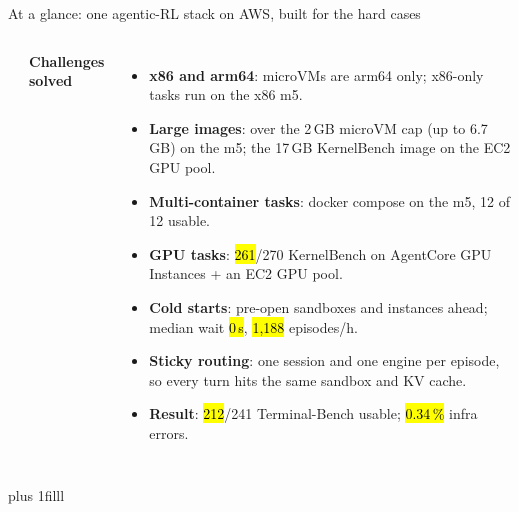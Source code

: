 \begin{frame}{At a glance: one agentic-RL stack on AWS, built for the hard cases}
\begin{columns}[T]
\begin{itemize}
\end{itemize}
{\normalsize\textbf{\textcolor{awsteal}{Challenges solved}}}
\begin{itemize}\footnotesize\setlength{\itemsep}{0.3mm}
\item \textbf{x86 and arm64}: microVMs are arm64 only; x86-only tasks run on the x86 m5.
\item \textbf{Large images}: over the 2\,GB microVM cap (up to 6.7\,GB) on the m5; the 17\,GB KernelBench image on the EC2 GPU pool.
\item \textbf{Multi-container tasks}: docker compose on the m5, 12 of 12 usable.
\item \textbf{GPU tasks}: \hl{261}/270 KernelBench on AgentCore GPU Instances + an EC2 GPU pool.
\item \textbf{Cold starts}: pre-open sandboxes and instances ahead; median wait \hl{0\,s}, \hl{1{,}188} episodes/h.
\item \textbf{Sticky routing}: one session and one engine per episode, so every turn hits the same sandbox and KV cache.
\item \textbf{Result}: \hl{212}/241 Terminal-Bench usable; \hl{0.34\,\%} infra errors.
\end{itemize}
\end{columns}
\par\vskip 0pt plus 1filll
\end{frame}

